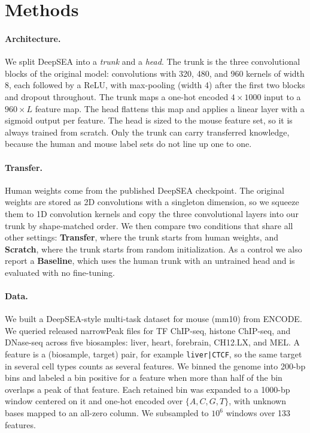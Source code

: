 \documentclass{article}
\begin{document}
\section{Methods}

\paragraph{Architecture.}
We split DeepSEA into a \emph{trunk} and a \emph{head}. The trunk is the three
convolutional blocks of the original model: convolutions with 320, 480, and 960
kernels of width 8, each followed by a ReLU, with max-pooling (width 4) after the
first two blocks and dropout throughout. The trunk maps a one-hot encoded
$4 \times 1000$ input to a $960 \times L$ feature map. The head flattens this map
and applies a linear layer with a sigmoid output per feature. The head is sized
to the mouse feature set, so it is always trained from scratch. Only the trunk
can carry transferred knowledge, because the human and mouse label sets do not
line up one to one.

\paragraph{Transfer.}
Human weights come from the published DeepSEA checkpoint. The original weights
are stored as 2D convolutions with a singleton dimension, so we squeeze them to
1D convolution kernels and copy the three convolutional layers into our trunk by
shape-matched order. We then compare two conditions that share all other
settings: \textbf{Transfer}, where the trunk starts from human weights, and
\textbf{Scratch}, where the trunk starts from random initialization. As a control
we also report a \textbf{Baseline}, which uses the human trunk with an untrained
head and is evaluated with no fine-tuning.

\paragraph{Data.}
We built a DeepSEA-style multi-task dataset for mouse (mm10) from ENCODE. We
queried released narrowPeak files for TF ChIP-seq, histone ChIP-seq, and DNase-seq
across five biosamples: liver, heart, forebrain, CH12.LX, and MEL. A feature is a
(biosample, target) pair, for example \texttt{liver|CTCF}, so the same target in
several cell types counts as several features. We binned the genome into 200-bp
bins and labeled a bin positive for a feature when more than half of the bin
overlaps a peak of that feature. Each retained bin was expanded to a 1000-bp
window centered on it and one-hot encoded over $\{A, C, G, T\}$, with unknown
bases mapped to an all-zero column. We subsampled to $10^6$ windows over 133
features.
\end{document}
